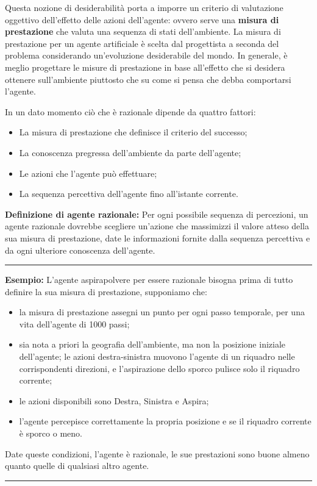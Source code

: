 \documentclass{article}
\begin{document}
Questa nozione di desiderabilità porta a imporre un criterio di valutazione oggettivo dell'effetto delle azioni dell'agente: ovvero serve una \textbf{misura di prestazione} che valuta una sequenza di stati dell'ambiente. La misura di prestazione per un agente artificiale è scelta dal progettista a seconda del problema considerando un'evoluzione desiderabile del mondo. In generale, è meglio progettare le misure di prestazione in base all'effetto che si desidera ottenere sull'ambiente piuttosto che su come si pensa che debba comportarsi l'agente.\newline

\noindent In un dato momento ciò che è razionale dipende da quattro fattori:
\begin{itemize}
    \item La misura di prestazione che definisce il criterio del successo;
    \item La conoscenza pregressa dell'ambiente da parte dell'agente;
    \item Le azioni che l'agente può effettuare;
    \item La sequenza percettiva dell'agente fino all'istante corrente.
\end{itemize}
\textbf{Definizione di agente razionale: }Per ogni possibile sequenza di percezioni, un agente razionale dovrebbe scegliere un'azione che massimizzi il valore atteso della sua misura di prestazione, date le informazioni fornite dalla sequenza percettiva e da ogni ulteriore conoscenza dell'agente.
\par\noindent\rule{\textwidth}{0.4pt}
\textbf{Esempio: }L'agente aspirapolvere per essere razionale bisogna prima di tutto definire la sua misura di prestazione, supponiamo che:
\begin{itemize}
    \item la misura di prestazione assegni un punto per ogni passo temporale, per una vita dell'agente di 1000 passi;
    \item sia nota a priori la geografia dell'ambiente, ma non la posizione iniziale dell'agente; le azioni destra-sinistra muovono l'agente di un riquadro nelle corrispondenti direzioni, e l'aspirazione dello sporco pulisce solo il riquadro corrente;
    \item le azioni disponibili sono Destra, Sinistra e Aspira;
    \item l'agente percepisce correttamente la propria posizione e se il riquadro corrente è sporco o meno.
\end{itemize}
\noindent Date queste condizioni, l'agente è razionale, le sue prestazioni sono buone almeno quanto quelle di qualsiasi altro agente.
\par\noindent\rule{\textwidth}{0.4pt}
\end{document}
